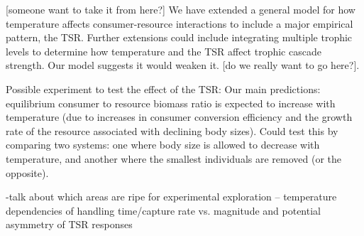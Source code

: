 \documentclass[11pt]{article}
\begin{document}
%
[someone want to take it from here?] We have extended a general model for how temperature affects consumer-resource interactions to include a major empirical pattern, the TSR. Further extensions could include integrating multiple trophic levels to determine how temperature and the TSR affect trophic cascade strength. Our model suggests it would weaken it. [do we really want to go here?]. 

Possible experiment to test the effect of the TSR:
Our main predictions: equilibrium consumer to resource biomass ratio is expected to increase with temperature (due to increases in consumer conversion efficiency and the growth rate of the resource associated with declining body sizes). Could test this by comparing two systems: one where body size is allowed to decrease with temperature, and another where the smallest individuals are removed (or the opposite). 

-talk about which areas are ripe for experimental exploration -- temperature dependencies of handling time/capture rate vs. magnitude and potential asymmetry of TSR responses








\newpage{}

\end{document}

